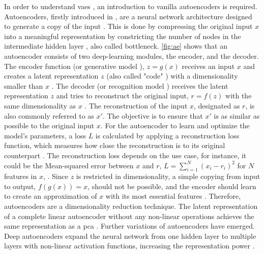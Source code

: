 In order to understand \glspl{vae} \cite{kingma2013AutoEncodingVariationalBayes}, an introduction to vanilla autoencoders is required.
Autoencoders, firstly introduced in \cite{rumelhart1986LearningInternalRepresentations}, are a neural network architecture designed to generate a copy of the input \cite{Goodfellow-et-al-2016, Bank2020Autoencoders}.
This is done by compressing the original input $x$ into a meaningful representation by constricting the number of nodes in the intermediate hidden layer \cite{aggarwal2018NeuralNetworksDeep, Bank2020Autoencoders}, also called bottleneck.
\autoref{fig:ae} shows that an autoencoder consists of two deep-learning modules, the encoder, and the decoder.
The encoder function (or generative model \cite{kingma2019IntroductionVariationalAutoencoders}), $z=g(x)$ receives an input $x$ and creates a latent representation $z$ (also called "code" \cite{aggarwal2018NeuralNetworksDeep}) with a dimensionality smaller than $x$ \cite{Goodfellow-et-al-2016, Bank2020Autoencoders}.
The decoder (or recognition model \cite{kingma2019IntroductionVariationalAutoencoders}) receives the latent representation $z$ and tries to reconstruct the original input, $r=f(z)$ with the same dimensionality as $x$ \cite{Goodfellow-et-al-2016}.
The reconstruction of the input $x$, designated as $r$, is also commonly referred to as $x'$. 
The objective is to ensure that $x'$ is as similar as possible to the original input $x$.
For the autoencoder to learn and optimize the model's parameters, a loss $L$ is calculated by applying a reconstruction loss function, which measures how close the reconstruction is to its original counterpart \cite{Bank2020Autoencoders, maheshwari2022AutoencoderIssuesChallenges}.
The reconstruction loss depends on the use case, for instance, it could be the Mean-squared error between $x$ and $r$, $L=\sum_{i=1}^{N}(x_i-r_i)^2$ for $N$ features in $x$, \cite{aggarwal2018NeuralNetworksDeep, Goodfellow-et-al-2016}.
Since $z$ is restricted in dimensionality, a simple copying from input to output, \ie $f(g(x))=x$, should not be possible, and the encoder should learn to create an approximation of $x$ with its most essential features \cite{aggarwal2018NeuralNetworksDeep}.
Therefore, autoencoders are a dimensionality reduction technique.
The latent representation of a complete linear autoencoder without any non-linear operations achieves the same representation as a \gls{pca} \cite{plaut2018PrincipalSubspacesPrincipal, Bank2020Autoencoders}.
Further variations of autoencoders have emerged.
Deep autoencoders expand the neural network from one hidden layer to multiple layers with non-linear activation functions, increasing the representation power \cite{aggarwal2018NeuralNetworksDeep}.

